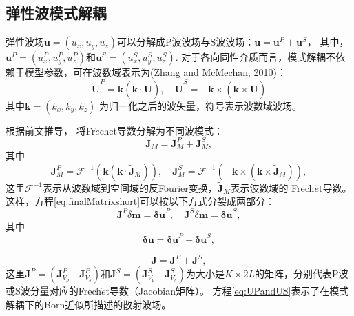 \subsection{弹性波模式解耦}
弹性波场$\mathbf{u}=(u_x,u_y,u_z)$可以分解成P波波场与S波波场：$\mathbf{u}=\mathbf{u}^P+\mathbf{u}^S$，
其中，$\mathbf{u}^P=(u^P_x,u^P_y,u^P_z)$和$\mathbf{u}^S=(u^S_x,u^S_y,u^S_z)$.
对于各向同性介质而言，模式解耦不依赖于模型参数，可在波数域表示为(Zhang and McMechan, 2010)\cite[]{zhang.mcmechan:2010}：
\begin{equation}
        \tilde{\mathbf U}^P=\mathbf k(\mathbf k\cdot \tilde{\mathbf U}), \quad
        \tilde{\mathbf U}^S=-\mathbf 
        k\times(\mathbf k\times \tilde{\mathbf U})
\label{eq:Decomp}
\end{equation}
其中$\mathbf k=(k_x,k_y,k_z)$ 为归一化之后的波矢量，符号$\tilde{}$表示波数域波场。

根据前文推导， 将Fr{$\acute{e}$}chet导数分解为不同波模式：
\begin{equation}
        {\mathbf J}_M={\mathbf J}^P_M+{\mathbf J}^S_M,
\label{eq:PropaMDall}
\end{equation}
其中
\begin{equation}
        {\mathbf J}^P_M=\mathcal{F}^{-1}(\mathbf k(\mathbf k\cdot \tilde{\mathbf
        J}_M)), \quad
        {\mathbf J}^S_M=\mathcal{F}^{-1}(-\mathbf
                k\times(\mathbf k\times \tilde{\mathbf J}_M)),
\label{eq:PropaMDsplit}
\end{equation}
这里$\mathcal{F}^{-1}$表示从波数域到空间域的反Fourier变换，$\tilde{\mathbf{J}}_M$表示波数域的 Frech{$\acute{e}$}t导数。
这样，方程\eqref{eq:finalMatrixshort}可以按以下方式分裂成两部分：
\begin{equation}
        \mathbf{J}^P\delta\mathbf{m}=\mathbf{\delta u}^P,\quad
        \mathbf{J}^S\delta\mathbf{m}=\mathbf{\delta u}^S,
        \label{eq:UPandUS}
\end{equation}
其中
\begin{equation}
        \mathbf{\delta u}=\mathbf{\delta u}^P+\mathbf{\delta u}^S,
        \label{eq:UPS}
\end{equation}

\begin{equation}
        \mathbf{J}=\mathbf{J}^P+\mathbf{J}^S,
        \label{eq:JPS}
\end{equation}
这里$\mathbf{J}^P=(\mathbf{J}^P_{V_p}\quad\mathbf{J}^P_{V_s})$和$\mathbf{J}^S=(\mathbf{J}^S_{V_p}\quad\mathbf{J}^S_{V_s})$为大小是$K\times{2L}$的矩阵，分别代表P波或S波分量对应的Frech{$\acute{e}$}t导数（Jacobian矩阵）。
方程\eqref{eq:UPandUS}表示了在模式解耦下的Born近似所描述的散射波场。

